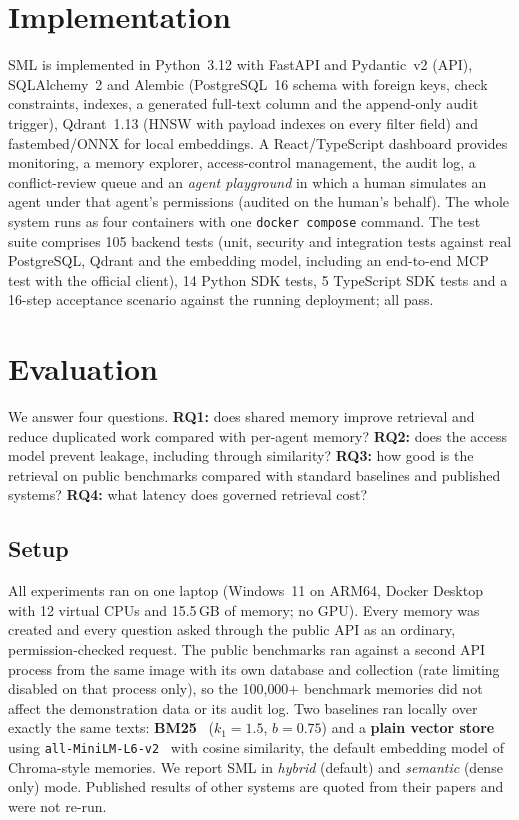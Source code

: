 \documentclass[11pt,a4paper]{article}
\newcommand{\sys}{SML}
\begin{document}
\section{Implementation}
\label{sec:impl}

\sys{} is implemented in Python~3.12 with FastAPI and Pydantic~v2 (API), SQLAlchemy~2 and Alembic
(PostgreSQL~16 schema with foreign keys, check constraints, indexes, a generated full-text column and the
append-only audit trigger), Qdrant~1.13 (HNSW with payload indexes on every filter field) and fastembed/ONNX
for local embeddings. A React/TypeScript dashboard provides monitoring, a memory explorer, access-control
management, the audit log, a conflict-review queue and an \emph{agent playground} in which a human
simulates an agent under that agent's permissions (audited on the human's behalf). The whole system runs
as four containers with one \texttt{docker compose} command. The test suite comprises 105 backend tests
(unit, security and integration tests against real PostgreSQL, Qdrant and the embedding model, including an
end-to-end MCP test with the official client), 14 Python SDK tests, 5 TypeScript SDK tests and a 16-step
acceptance scenario against the running deployment; all pass.

\section{Evaluation}
\label{sec:eval}

We answer four questions. \textbf{RQ1:} does shared memory improve retrieval and reduce duplicated work
compared with per-agent memory? \textbf{RQ2:} does the access model prevent leakage, including through
similarity? \textbf{RQ3:} how good is the retrieval on public benchmarks compared with standard baselines
and published systems? \textbf{RQ4:} what latency does governed retrieval cost?

\subsection{Setup}

All experiments ran on one laptop (Windows~11 on ARM64, Docker Desktop with 12 virtual CPUs and 15.5\,GB of
memory; no GPU). Every memory was created and every question asked through the public API as an ordinary,
permission-checked request. The public benchmarks ran against a second API process from the same image with
its own database and collection (rate limiting disabled on that process only), so the 100{,}000+ benchmark
memories did not affect the demonstration data or its audit log. Two baselines ran locally over exactly the
same texts: \textbf{BM25}~\cite{robertson2009bm25} ($k_1{=}1.5$, $b{=}0.75$) and a \textbf{plain vector store}
using \texttt{all-MiniLM-L6-v2}~\cite{wang2020minilm,reimers2019sbert} with cosine similarity, the default
embedding model of Chroma-style memories. We report \sys{} in \emph{hybrid} (default) and \emph{semantic}
(dense only) mode. Published results of other systems are quoted from their papers and were not re-run.
\end{document}
